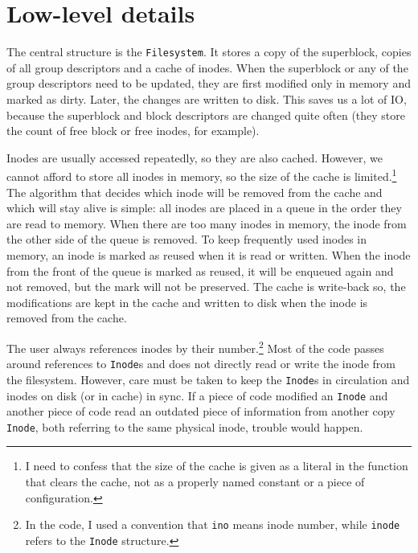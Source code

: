 \chapter{Low-level details}

The central structure is the \texttt{Filesystem}. It stores a copy of the
superblock, copies of all group descriptors and a cache of inodes. When the
superblock or any of the group descriptors need to be updated, they are first
modified only in memory and marked as dirty. Later, the changes are written to
disk. This saves us a lot of IO, because the superblock and block descriptors
are changed quite often (they store the count of free block or free inodes, for
example).

Inodes are usually accessed repeatedly, so they are also cached. However, we
cannot afford to store all inodes in memory, so the size of the cache is
limited.\footnote{I need to confess that the size of the cache is given as a
  literal in the function that clears the cache, not as a properly named
constant or a piece of configuration.} The algorithm that decides which inode
will be removed from the cache and which will stay alive is simple: all inodes
are placed in a queue in the order they are read to memory. When there are too
many inodes in memory, the inode from the other side of the queue is removed. To
keep frequently used inodes in memory, an inode is marked as reused when it is
read or written. When the inode from the front of the queue is marked as reused,
it will be enqueued again and not removed, but the mark will not be preserved.
The cache is write-back so, the modifications are kept in the cache and written
to disk when the inode is removed from the cache.

The user always references inodes by their number.\footnote{In the code, I used
a convention that \texttt{ino} means inode number, while \texttt{inode} refers
to the \texttt{Inode} structure.} Most of the code passes around references to
\texttt{Inode}s and does not directly read or write the inode from the
filesystem. However, care must be taken to keep the \texttt{Inode}s in
circulation and inodes on disk (or in cache) in sync. If a piece of code
modified an \texttt{Inode} and another piece of code read an outdated piece of
information from another copy \texttt{Inode}, both referring to the same
physical inode, trouble would happen.


